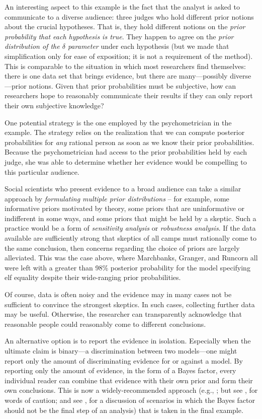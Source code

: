 An interesting aspect to this example is the fact that the analyst is asked to communicate to a diverse audience: three judges who hold different prior notions about the crucial hypotheses. {That is, they hold different notions on the \emph{prior probability that each hypothesis is true}. They happen to agree on the \emph{prior distribution of the $\delta$ parameter} under each hypothesis (but we made that simplification only for ease of exposition; it is not a requirement of the method).} This is comparable to the situation in which most researchers find themselves: there is one data set that brings evidence, but there are many---possibly diverse---prior notions. Given that prior probabilities must be subjective, how can researchers hope to reasonably communicate their results if they can only report their own subjective knowledge?

One potential strategy is the one employed by the psychometrician in the example.  The strategy relies on the realization that we can compute posterior probabilities for \emph{any} rational person as soon as we know their prior probabilities.  Because the psychometrician had access to the prior probabilities held by each judge, she was able to determine whether her evidence would be compelling to this particular audience.

Social scientists who present evidence to a broad audience can take a similar approach by \emph{formulating multiple prior distributions} -- for example, some informative priors motivated by theory, some priors that are uninformative or indifferent in some ways, and some priors that might be held by a skeptic. Such a practice would be a form of \emph{sensitivity analysis} or \emph{robustness analysis}.  
If the data available are sufficiently strong that skeptics of all camps must rationally come to the same conclusion, then concerns regarding the choice of priors are largely alleviated.
This was the case above, where Marchbanks, Granger, and Runcorn all were left with a greater than 98\% posterior probability for the model specifying elf equality despite their wide-ranging prior probabilities.

Of course, data is often noisy and the evidence may in many cases not be sufficient to convince the strongest skeptics. In such cases, collecting further data may be useful. Otherwise, the researcher can transparently acknowledge that reasonable people could reasonably come to different conclusions. 

An alternative option is to report the evidence in isolation.  Especially when the ultimate claim is binary---a discrimination between two models---one might report only the amount of discriminating evidence for or against a model. By reporting only the amount of evidence, in the form of a Bayes factor, every individual reader can combine that evidence with their own prior and form their own conclusions. This is now a widely-recommended approach (e.g., ; but see , for words of caution{; and see , for a discussion of scenarios in which the Bayes factor should not be the final step of an analysis}) that is taken in the final example.

